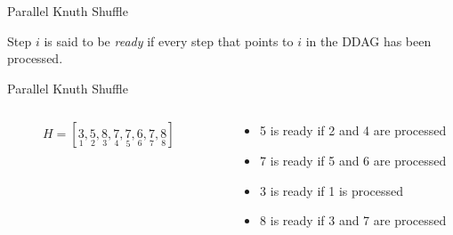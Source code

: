 \begin{frame}{Parallel Knuth Shuffle}
  \begin{definition}[Ready]
    Step \(i\) is said to be \textit{ready} if every step that
    points to \(i\) in the DDAG has been processed.
  \end{definition}
\end{frame}

\begin{frame}{Parallel Knuth Shuffle}
  \begin{columns}
    \begin{column}{0.4\textwidth}
      \begin{figure}
        \begin{center}
        \end{center}
        \caption{\(H = [
          \underset{1}{3}, 
          \underset{2}{5}, 
          \underset{3}{8}, 
          \underset{4}{7}, 
          \underset{5}{7}, 
          \underset{6}{6}, 
          \underset{7}{7}, 
          \underset{8}{8} 
        ]\)}
      \end{figure}
    \end{column}
    \begin{column}{0.6\textwidth}
      \begin{itemize}
        \item 5 is ready if 2 and 4 are processed
        \item 7 is ready if 5 and 6 are processed
        \item 3 is ready if 1 is processed
        \item 8 is ready if 3 and 7 are processed
      \end{itemize}
    \end{column}
  \end{columns}
\end{frame}

